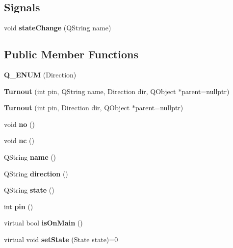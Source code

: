 \subsection*{Signals}
\begin{DoxyCompactItemize}
\item 
\mbox{\label{classTurnout_af184ceca5457de620541017d711204b6}} 
void {\bfseries state\+Change} (Q\+String name)
\end{DoxyCompactItemize}
\subsection*{Public Member Functions}
\begin{DoxyCompactItemize}
\item 
\mbox{\label{classTurnout_a5f5e6fc12ec957758010cd4eb3ed41b7}} 
{\bfseries Q\+\_\+\+E\+N\+UM} (Direction)
\item 
\mbox{\label{classTurnout_a337a41170c90bd67ce308c0a39be83ab}} 
{\bfseries Turnout} (int pin, Q\+String name, Direction dir, Q\+Object $\ast$parent=nullptr)
\item 
\mbox{\label{classTurnout_ad732b5d164b51989efbf15910e89207a}} 
{\bfseries Turnout} (int pin, Direction dir, Q\+Object $\ast$parent=nullptr)
\item 
\mbox{\label{classTurnout_a3756614bdf1954b7855a29148bc388e6}} 
void {\bfseries no} ()
\item 
\mbox{\label{classTurnout_ad012bbace4a365d530640c511b69014f}} 
void {\bfseries nc} ()
\item 
\mbox{\label{classTurnout_a18d8e29c202ed64091fcc9c61c06cbaf}} 
Q\+String {\bfseries name} ()
\item 
\mbox{\label{classTurnout_ae2f2d2c69fe1cc863b29064092460c62}} 
Q\+String {\bfseries direction} ()
\item 
\mbox{\label{classTurnout_a1f27c3cd43df36267f9311fc4fbd58fb}} 
Q\+String {\bfseries state} ()
\item 
\mbox{\label{classTurnout_a276a6d7779e7191057adc89c35cf7333}} 
int {\bfseries pin} ()
\item 
\mbox{\label{classTurnout_ae7197fb76f53d720c0fa2828746bd913}} 
virtual bool {\bfseries is\+On\+Main} ()
\item 
\mbox{\label{classTurnout_a0f99553ab7a67b90e449bf22f7594d8e}} 
virtual void {\bfseries set\+State} (State state)=0
\end{DoxyCompactItemize}
